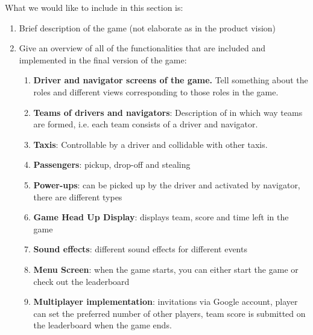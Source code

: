 What we would like to include in this section is:
\begin{enumerate}
	\item Brief description of the game (not elaborate as in the product vision)
	\item Give an overview of all of the functionalities that are included and implemented
	in the final version of the game:
	\begin{enumerate}
		\item \textbf{Driver and navigator screens of the game.} Tell something about the roles and
		different views corresponding to those roles in the game.
		\item \textbf{Teams of drivers and navigators}: Description of in which way teams are formed,
		i.e. each team consists of a driver and navigator.
		\item \textbf{Taxis}: Controllable by a driver and collidable with other taxis.
		\item \textbf{Passengers}: pickup, drop-off and stealing
		\item \textbf{Power-ups}: can be picked up by the driver and activated by navigator, there are different types
		\item \textbf{Game Head Up Display}: displays team, score and time left in the game
		\item \textbf{Sound effects}: different sound effects for different events
		\item \textbf{Menu Screen}: when the game starts, you can either start the game or check out the leaderboard
		\item \textbf{Multiplayer implementation}: invitations via Google account, player can set the preferred number of
		      other players, team score is submitted on the leaderboard when the game ends.
	\end{enumerate}
\end{enumerate}